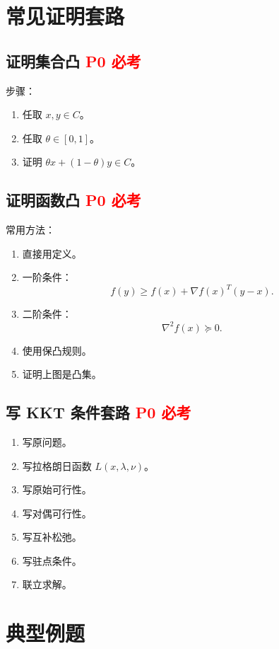 \documentclass[11pt,a4paper]{ctexart}
\newcommand{\Pzero}{\textcolor{red}{\textbf{P0 必考}}}
\theoremstyle{definition}
\theoremstyle{plain}
\theoremstyle{remark}
\begin{document}
\section{常见证明套路}

\subsection{证明集合凸 \Pzero}

步骤：

\begin{enumerate}
    \item 任取 $x,y\in C$。
    \item 任取 $\theta\in[0,1]$。
    \item 证明 $\theta x+(1-\theta)y\in C$。
\end{enumerate}

\subsection{证明函数凸 \Pzero}

常用方法：

\begin{enumerate}
    \item 直接用定义。
    \item 一阶条件：
    \[
        f(y)\ge f(x)+\nabla f(x)^T(y-x).
    \]
    \item 二阶条件：
    \[
        \nabla^2 f(x)\succeq0.
    \]
    \item 使用保凸规则。
    \item 证明上图是凸集。
\end{enumerate}

\subsection{写 KKT 条件套路 \Pzero}

\begin{enumerate}
    \item 写原问题。
    \item 写拉格朗日函数 $L(x,\lambda,\nu)$。
    \item 写原始可行性。
    \item 写对偶可行性。
    \item 写互补松弛。
    \item 写驻点条件。
    \item 联立求解。
\end{enumerate}

\section{典型例题}
\end{document}
